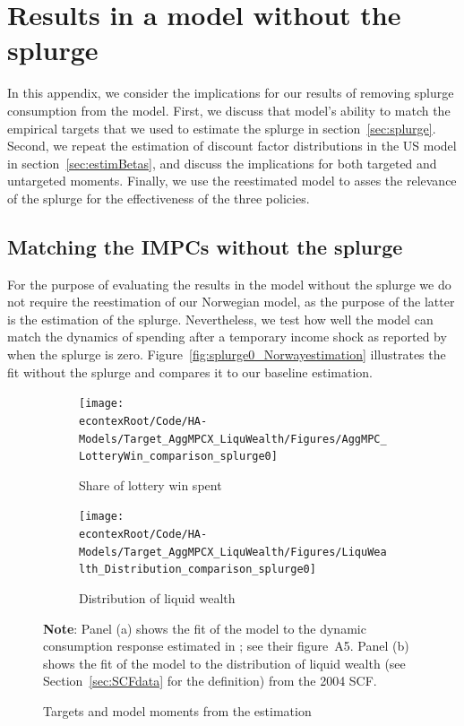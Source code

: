 \documentclass[\econtexRoot/HAFiscal]{subfiles}
\begin{document}
\FloatBarrier

\hypertarget{Model_without_splurge}{}\par\section{Results in a model without the splurge}
\notinsubfile{\label{app:Model_without_splurge}}

In this appendix, we consider the implications for our results of removing splurge consumption from the model.
First, we discuss that model's ability to match the empirical targets that we used to estimate the splurge in section~\ref{sec:splurge}.
Second, we repeat the estimation of discount factor distributions in the US model in section~\ref{sec:estimBetas}, and discuss the implications for both targeted and untargeted moments.
Finally, we use the reestimated model to asses the relevance of the splurge for the effectiveness of the three policies.


\subsection{Matching the IMPCs without the splurge}

For the purpose of evaluating the results in the model without the splurge we do not require the reestimation of our Norwegian model, as the purpose of the latter is the estimation of the splurge.
Nevertheless, we test how well the model can match the dynamics of spending after a temporary income shock as reported by \citet{fagereng_mpc_2021} when the splurge is zero.
Figure~\ref{fig:splurge0_Norwayestimation} illustrates the fit without the splurge and compares it to our baseline estimation.


\begin{figure}[htb]
	\centering
	\begin{subfigure}[b]{.48\linewidth}
		\centering
		\texttt{[image: \\econtexRoot/Code/HA-Models/Target\_AggMPCX\_LiquWealth/Figures/AggMPC\_LotteryWin\_comparison\_splurge0]}
		\caption{Share of lottery win spent}
		\notinsubfile{\label{fig:aggmpclotterywin}}
	\end{subfigure}
	\begin{subfigure}[b]{.48\linewidth}
		\centering
		\texttt{[image: \\econtexRoot/Code/HA-Models/Target\_AggMPCX\_LiquWealth/Figures/LiquWealth\_Distribution\_comparison\_splurge0]}
		\caption{Distribution of liquid wealth}
		\notinsubfile{\label{fig:liquwealthdistribution}}
	\end{subfigure}%
	\caption{Targets and model moments from the estimation}
	\notinsubfile{\label{fig:splurge0_Norwayestimation}}
	\parbox{16cm}{\small \vspace{.15cm} \textbf{Note}: Panel (a) shows the fit of the model to the dynamic consumption response estimated in \citet{fagereng_mpc_2021}; see their figure~A5.
Panel (b) shows the fit of the model to the distribution of liquid wealth (see Section~\ref{sec:SCFdata} for the definition) from the 2004 SCF.\normalsize}
\end{figure}
\end{document}
